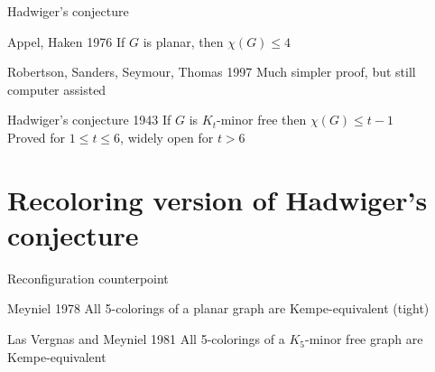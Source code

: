 \documentclass[11pt,xcolor=dvipsnames,presentation,aspectratio=169]{beamer}
\begin{document}
\begin{frame}{Hadwiger's conjecture}

  \begin{block}{Appel, Haken 1976}
    If $G$ is planar, then $\chi(G) \le 4$
  \end{block}

  \begin{block}{Robertson, Sanders, Seymour, Thomas 1997}
    Much simpler proof, but still computer assisted 
  \end{block}
  
  \begin{alertblock}{Hadwiger's conjecture 1943}
    If $G$ is $K_t$-minor free then $\chi(G) \le t-1$\\
    Proved for $1 \le t \le 6$, widely open for $t > 6$
  \end{alertblock}
\end{frame}

\section{Recoloring version of Hadwiger's conjecture}
\begin{frame}{Reconfiguration counterpoint}

  \begin{block}{Meyniel 1978}
    All 5-colorings of a planar graph are Kempe-equivalent (tight)
  \end{block}

  \begin{block}{Las Vergnas and Meyniel 1981}
    All 5-colorings of a $K_5$-minor free graph are Kempe-equivalent
  \end{block}

\end{frame}
\end{document}
